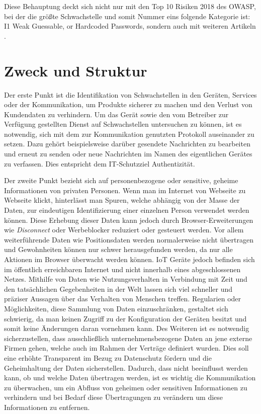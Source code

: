 Diese Behauptung deckt sich nicht nur mit den Top 10 Risiken 2018 des \ac{OWASP}, bei der die größte Schwachstelle und somit Nummer eins folgende Kategorie ist: \glqq I1 Weak Guessable, or Hardcoded Passwords\grqq{}, sondern auch mit weiteren Artikeln \cite{guzman_2019,eckstein_2018}.

\section{Zweck und Struktur}

    Der erste Punkt ist die Identifikation von Schwachstellen in den Geräten, Services oder der Kommunikation, um Produkte sicherer zu machen und den Verlust von Kundendaten zu verhindern.
    Um das Gerät sowie den vom Betreiber zur Verfügung gestellten Dienst auf Schwachstellen untersuchen zu können, ist es notwendig, sich mit dem zur Kommunikation genutzten Protokoll auseinander zu setzen. Dazu gehört beispielsweise darüber gesendete Nachrichten zu bearbeiten und erneut zu senden oder neue Nachrichten im Namen des eigentlichen Gerätes zu verfassen. Dies entspricht dem IT-Schutzziel Authentizität.
    
    Der zweite Punkt bezieht sich auf personenbezogene oder sensitive, geheime Informationen von privaten Personen.
    Wenn man im Internet von Webseite zu Webseite klickt, hinterlässt man Spuren, welche abhängig von der Masse der Daten, zur eindeutigen Identifizierung einer einzelnen Person verwendet werden können. %
    Diese Erhebung dieser Daten kann jedoch durch Browser-Erweiterungen wie \emph{Disconnect} oder Werbeblocker reduziert oder gesteuert werden. Vor allem weiterführende Daten wie Positionsdaten werden normalerweise nicht übertragen und Gewohnheiten können nur schwer herausgefunden werden, da nur alle Aktionen im Browser überwacht werden können.
    \ac{IoT} Geräte jedoch befinden sich im öffentlich erreichbaren Internet und nicht innerhalb eines abgeschlossenen Netzes. Mithilfe von Daten wie Nutzungsverhalten in Verbindung mit Zeit und den tatsächlichen Gegebenheiten in der Welt lassen sich viel schneller und präziser Aussagen über das Verhalten von Menschen treffen. %
    Regularien oder Möglichkeiten, diese Sammlung von Daten einzuschränken, gestaltet sich schwierig, da man keinen Zugriff zu der Konfiguration der Geräten besitzt und somit keine Änderungen daran vornehmen kann.
    Des Weiteren ist es notwendig sicherzustellen, dass ausschließlich unternehmensbezogene Daten an jene externe Firmen gehen, welche auch im Rahmen der Verträge definiert wurden. Dies soll eine erhöhte Transparent im Bezug zu Datenschutz fördern und die Geheimhaltung der Daten sicherstellen.
    Dadurch, dass nicht beeinflusst werden kann, ob und welche Daten übertragen werden, ist es wichtig die Kommunikation zu überwachen, um ein Abfluss von geheimen oder sensitiven Informationen zu verhindern und bei Bedarf diese Übertragungen zu verändern um diese Informationen zu entfernen.
    
